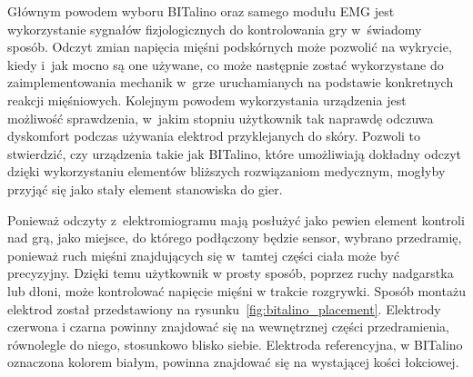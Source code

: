 Głównym powodem wyboru BITalino oraz samego modułu EMG jest wykorzystanie sygnałów fizjologicznych do kontrolowania gry w~świadomy sposób. Odczyt zmian napięcia mięśni podskórnych może pozwolić na wykrycie, kiedy i~jak mocno są one używane, co może następnie zostać wykorzystane do zaimplementowania mechanik w~grze uruchamianych na podstawie konkretnych reakcji mięśniowych. Kolejnym powodem wykorzystania urządzenia jest możliwość sprawdzenia, w~jakim stopniu użytkownik tak naprawdę odczuwa dyskomfort podczas używania elektrod przyklejanych do skóry. Pozwoli to stwierdzić, czy urządzenia takie jak BITalino, które umożliwiają dokładny odczyt dzięki wykorzystaniu elementów bliższych rozwiązaniom medycznym, mogłyby przyjąć się jako stały element stanowiska do gier.

Ponieważ odczyty z~elektromiogramu mają posłużyć jako pewien element kontroli nad grą, jako miejsce, do którego podłączony będzie sensor, wybrano przedramię, ponieważ ruch mięśni znajdujących się w~tamtej części ciała może być precyzyjny. Dzięki temu użytkownik w prosty sposób, poprzez ruchy nadgarstka lub dłoni, może kontrolować napięcie mięśni w trakcie rozgrywki. Sposób montażu elektrod został przedstawiony na rysunku~\ref{fig:bitalino_placement}. Elektrody czerwona i czarna powinny znajdować się na wewnętrznej części przedramienia, równolegle do niego, stosunkowo blisko siebie. Elektroda referencyjna, w BITalino oznaczona kolorem białym, powinna znajdować się na wystającej kości łokciowej.

